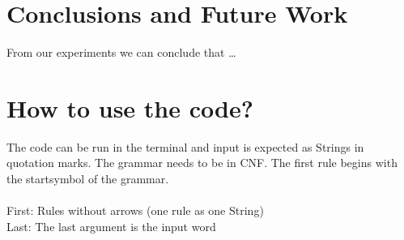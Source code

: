 \documentclass[a4paper, 11pt]{article}
\begin{document}
\section{Conclusions and Future Work}

From our experiments we can conclude that \ldots

\newpage













\appendix

\section{How to use the code?}

The code can be run in the terminal and input is expected as Strings in quotation marks. The grammar needs to be in CNF. The first rule begins with the startsymbol of the grammar. \\ \\
First: Rules without arrows (one rule as one String) \\
Last: The last argument is the input word
\\ 
\end{document}

